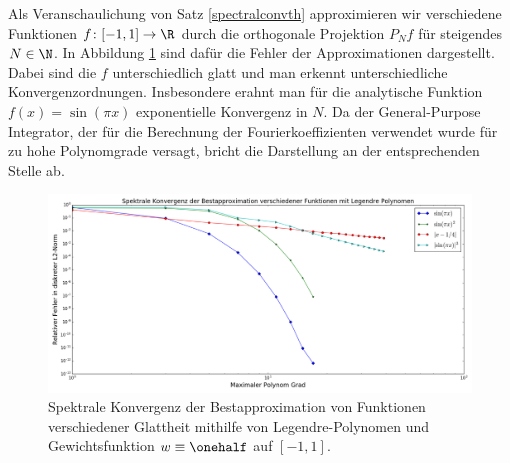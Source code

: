 \begin{mathbsp}
Als Veranschaulichung von Satz \ref{spectralconvth} approximieren wir verschiedene Funktionen $f\colon [-1,1]\to\R$ durch die orthogonale Projektion $P_Nf$ für steigendes $N\in\N$. In Abbildung \ref{figurespectralconverg} sind dafür die Fehler der Approximationen dargestellt. Dabei sind die $f$ unterschiedlich glatt und man erkennt unterschiedliche Konvergenzordnungen. Insbesondere erahnt man für die analytische Funktion $f(x)=\sin(\pi x)$ exponentielle Konvergenz in $N$. Da der General-Purpose Integrator, der für die Berechnung der Fourierkoeffizienten verwendet wurde für zu hohe Polynomgrade versagt, bricht die Darstellung an der entsprechenden Stelle ab.
\begin{figure}[h]
\includegraphics[width=\textwidth]{Figures/spectral_convergence_legendre.png}
\caption{Spektrale Konvergenz der Bestapproximation von Funktionen verschiedener Glattheit mithilfe von Legendre-Polynomen und Gewichtsfunktion $w\equiv \onehalf$ auf $[-1,1]$.}
\label{figurespectralconverg}
\end{figure}
\end{mathbsp}

